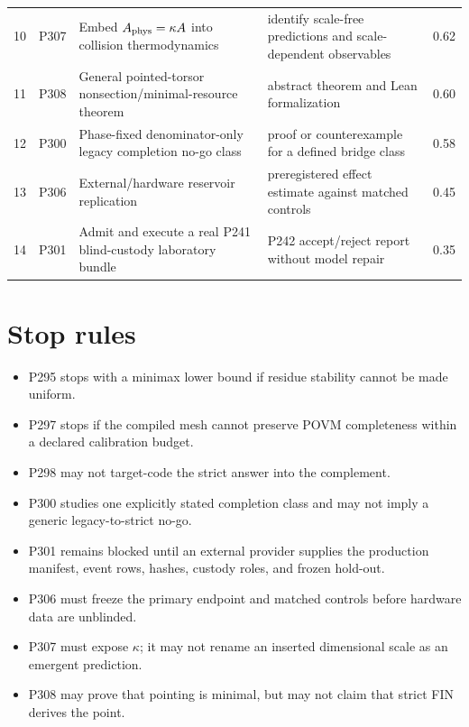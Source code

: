 \documentclass[11pt,a4paper,openany]{report}
\begin{document}
\begin{center}
\begin{longtable}{@{}p{}p{}p{}p{}p{}@{}}
10 & P307 & Embed \(A_{\rm phys}=\kappa A\) into collision thermodynamics & identify scale-free predictions and scale-dependent observables & 0.62 \\
11 & P308 & General pointed-torsor nonsection/\allowbreak{}minimal-resource theorem & abstract theorem and Lean formalization & 0.60 \\
12 & P300 & Phase-fixed denominator-only legacy completion no-go class & proof or counterexample for a defined bridge class & 0.58 \\
13 & P306 & External/\allowbreak{}hardware reservoir replication & preregistered effect estimate against matched controls & 0.45 \\
14 & P301 & Admit and execute a real P241 blind-custody laboratory bundle & P242 accept/\allowbreak{}reject report without model repair & 0.35 \\
\bottomrule
\end{longtable}
\endgroup
\end{center}

\section{Stop rules}

\begin{itemize}
\item 
P295 stops with a minimax lower bound if residue stability cannot be made uniform.

\item 
P297 stops if the compiled mesh cannot preserve POVM completeness within a declared calibration budget.

\item 
P298 may not target-code the strict answer into the complement.

\item 
P300 studies one explicitly stated completion class and may not imply a generic legacy-to-strict no-go.

\item 
P301 remains blocked until an external provider supplies the production manifest, event rows, hashes, custody roles, and frozen hold-out.

\item 
P306 must freeze the primary endpoint and matched controls before hardware data are unblinded.

\item 
P307 must expose \(\kappa\); it may not rename an inserted dimensional scale as an emergent prediction.

\item 
P308 may prove that pointing is minimal, but may not claim that strict FIN derives the point.

\end{itemize}
\end{document}
